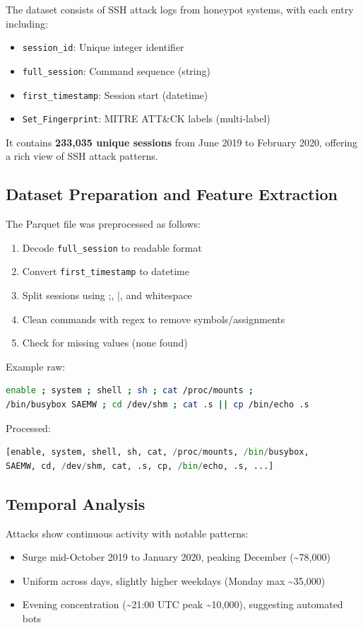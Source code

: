 \documentclass[acmlarge,screen,nonacm]{acmart}
\begin{document}
The dataset consists of SSH attack logs from honeypot systems, with each entry including:
\begin{itemize}
    \item \texttt{session\_id}: Unique integer identifier
    \item \texttt{full\_session}: Command sequence (string)
    \item \texttt{first\_timestamp}: Session start (datetime)
    \item \texttt{Set\_Fingerprint}: MITRE ATT\&CK labels (multi-label)
\end{itemize}

It contains \textbf{233,035 unique sessions} from June 2019 to February 2020, offering a rich view of SSH attack patterns.

\subsection{Dataset Preparation and Feature Extraction}

The Parquet file was preprocessed as follows:
\begin{enumerate}
    \item Decode \texttt{full\_session} to readable format
    \item Convert \texttt{first\_timestamp} to datetime
    \item Split sessions using ;, |, and whitespace
    \item Clean commands with regex to remove symbols/assignments
    \item Check for missing values (none found)
\end{enumerate}

Example raw: \begin{lstlisting}[language=bash]
enable ; system ; shell ; sh ; cat /proc/mounts ; 
/bin/busybox SAEMW ; cd /dev/shm ; cat .s || cp /bin/echo .s
\end{lstlisting}

Processed: \begin{lstlisting}[language=Python]
[enable, system, shell, sh, cat, /proc/mounts, /bin/busybox, 
SAEMW, cd, /dev/shm, cat, .s, cp, /bin/echo, .s, ...]
\end{lstlisting}

\subsection{Temporal Analysis}

Attacks show continuous activity with notable patterns:
\begin{itemize}
    \item Surge mid-October 2019 to January 2020, peaking December (\textasciitilde78,000)
    \item Uniform across days, slightly higher weekdays (Monday max \textasciitilde35,000)
    \item Evening concentration (\textasciitilde21:00 UTC peak \textasciitilde10,000), suggesting automated bots
\end{itemize}
\end{document}
